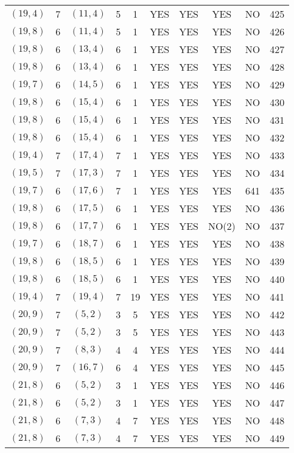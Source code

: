 \begin{longtable}{|c|c|c|c|c|c|c|c|c|c|}
$(19, 4)$ & 7 & $(11, 4)$ & 5 & 1 & YES & YES & YES & NO & 425\\
$(19, 8)$ & 6 & $(11, 4)$ & 5 & 1 & YES & YES & YES & NO & 426\\
$(19, 8)$ & 6 & $(13, 4)$ & 6 & 1 & YES & YES & YES & NO & 427\\
$(19, 8)$ & 6 & $(13, 4)$ & 6 & 1 & YES & YES & YES & NO & 428\\
$(19, 7)$ & 6 & $(14, 5)$ & 6 & 1 & YES & YES & YES & NO & 429\\
$(19, 8)$ & 6 & $(15, 4)$ & 6 & 1 & YES & YES & YES & NO & 430\\
$(19, 8)$ & 6 & $(15, 4)$ & 6 & 1 & YES & YES & YES & NO & 431\\
$(19, 8)$ & 6 & $(15, 4)$ & 6 & 1 & YES & YES & YES & NO & 432\\
$(19, 4)$ & 7 & $(17, 4)$ & 7 & 1 & YES & YES & YES & NO & 433\\
$(19, 5)$ & 7 & $(17, 3)$ & 7 & 1 & YES & YES & YES & NO & 434\\
$(19, 7)$ & 6 & $(17, 6)$ & 7 & 1 & YES & YES & YES & 641 & 435\\
$(19, 8)$ & 6 & $(17, 5)$ & 6 & 1 & YES & YES & YES & NO & 436\\
$(19, 8)$ & 6 & $(17, 7)$ & 6 & 1 & YES & YES & NO(2) & NO & 437\\
$(19, 7)$ & 6 & $(18, 7)$ & 6 & 1 & YES & YES & YES & NO & 438\\
$(19, 8)$ & 6 & $(18, 5)$ & 6 & 1 & YES & YES & YES & NO & 439\\
$(19, 8)$ & 6 & $(18, 5)$ & 6 & 1 & YES & YES & YES & NO & 440\\
$(19, 4)$ & 7 & $(19, 4)$ & 7 & 19 & YES & YES & YES & NO & 441\\
$(20, 9)$ & 7 & $(5, 2)$ & 3 & 5 & YES & YES & YES & NO & 442\\
$(20, 9)$ & 7 & $(5, 2)$ & 3 & 5 & YES & YES & YES & NO & 443\\
$(20, 9)$ & 7 & $(8, 3)$ & 4 & 4 & YES & YES & YES & NO & 444\\
$(20, 9)$ & 7 & $(16, 7)$ & 6 & 4 & YES & YES & YES & NO & 445\\
$(21, 8)$ & 6 & $(5, 2)$ & 3 & 1 & YES & YES & YES & NO & 446\\
$(21, 8)$ & 6 & $(5, 2)$ & 3 & 1 & YES & YES & YES & NO & 447\\
$(21, 8)$ & 6 & $(7, 3)$ & 4 & 7 & YES & YES & YES & NO & 448\\
$(21, 8)$ & 6 & $(7, 3)$ & 4 & 7 & YES & YES & YES & NO & 449\\

\end{longtable}
